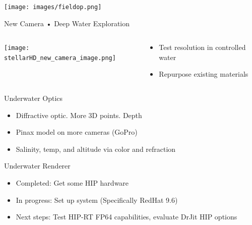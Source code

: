 \begin{frame}
    \vspace{1em}
    \centering
    \texttt{[image: images/fieldop.png]}
\end{frame}

\begin{frame}{New Camera • Deep Water Exploration}
    \begin{columns}
        \begin{column}{0.5\textwidth}
            \centering
            \texttt{[image: stellarHD\_new\_camera\_image.png]}
        \end{column}
        \begin{column}{0.5\textwidth}
            \begin{itemize}
            \item Test resolution in controlled water
            \item Repurpose existing materials
            \end{itemize}    
        \end{column}
    \end{columns}
\end{frame}

\begin{frame}{Underwater Optics}
    \begin{itemize}
        \item Diffractive optic. More 3D points. Depth
        \item Pinax model on more cameras (GoPro)
        \item Salinity, temp, and altitude via color and refraction
    \end{itemize}    
\end{frame}

\begin{frame}{Underwater Renderer}
    \begin{itemize}
        \item Completed: Get some HIP hardware
        \item In progress: Set up system (Specifically RedHat 9.6)
        \item Next steps: Test HIP-RT FP64 capabilities, evaluate DrJit HIP options
    \end{itemize}    
\end{frame}

